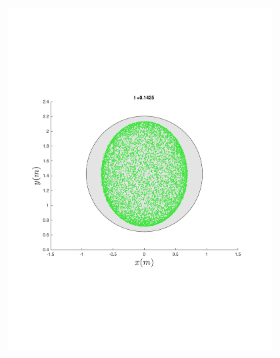 \begin{figure}
{\begin{subfigure}{0.5\textwidth}
\begin{subfigure}[b]{0.5\textwidth}
        \includegraphics[trim={1cm 7cm 1cm 7cm},
        width=\textwidth]{figures/method/FunnelSimOverlaid20funnel-1}
      \end{subfigure}%
    \end{subfigure} %
  }
\end{figure}
